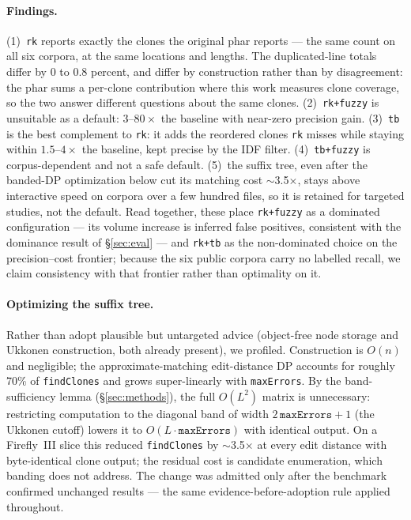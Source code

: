 \documentclass[10pt,a4paper]{article}
\newcounter{lem}[section]
\begin{document}
\paragraph{Findings.} (1)~\texttt{rk} reports exactly the clones the original phar reports --- the
same count on all six corpora, at the same locations and lengths. The duplicated-line totals differ
by 0 to 0.8 percent, and differ by construction rather than by disagreement: the phar sums a
per-clone contribution where this work measures clone coverage, so the two answer different
questions about the same clones. (2)~\texttt{rk+fuzzy} is unsuitable as a default: $3$--$80\times$ the baseline with
near-zero precision gain. (3)~\texttt{tb} is the best complement to \texttt{rk}: it adds the
reordered clones \texttt{rk} misses while staying within $1.5$--$4\times$ the baseline, kept precise
by the IDF filter. (4)~\texttt{tb+fuzzy} is corpus-dependent and not a safe default.
(5)~the suffix tree, even after the banded-DP optimization below cut its matching cost
$\sim$3.5$\times$, stays above interactive speed on corpora over a few hundred files, so it is retained
for targeted studies, not the default. Read together, these place \texttt{rk+fuzzy} as a dominated
configuration --- its volume increase is inferred false positives, consistent with the dominance
result of \S\ref{sec:eval} --- and \texttt{rk+tb} as the non-dominated choice on the precision--cost
frontier; because the six public corpora carry no labelled recall, we claim consistency with that
frontier rather than optimality on it.

\paragraph{Optimizing the suffix tree.} Rather than adopt plausible but untargeted advice (object-free
node storage and Ukkonen construction, both already present), we profiled. Construction is $O(n)$ and
negligible; the approximate-matching edit-distance DP accounts for roughly 70\% of \texttt{findClones}
and grows super-linearly with \texttt{maxErrors}. By the band-sufficiency lemma (\S\ref{sec:methods}),
the full $O(L^2)$ matrix is unnecessary: restricting computation to the diagonal band of width
$2\,\texttt{maxErrors}+1$ (the Ukkonen cutoff) lowers it to $O(L\cdot\texttt{maxErrors})$ with identical
output. On a Firefly~III slice this reduced \texttt{findClones} by
$\sim$3.5$\times$ at every edit distance with byte-identical clone output; the residual cost is
candidate enumeration, which banding does not address. The change was admitted only after the benchmark
confirmed unchanged results --- the same evidence-before-adoption rule applied throughout.
\end{document}
